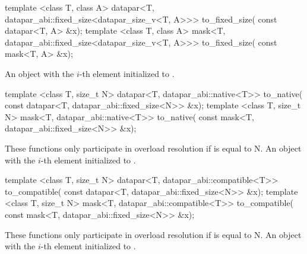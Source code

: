 \begin{itemdecl}
template <class T, class A>
datapar<T, datapar_abi::fixed_size<datapar_size_v<T, A>>> to_fixed_size(
    const datapar<T, A> &x);
template <class T, class A>
mask<T, datapar_abi::fixed_size<datapar_size_v<T, A>>> to_fixed_size(
    const mask<T, A> &x);
\end{itemdecl}
\begin{itemdescr}
  \pnum\returns An object with the $i$-th element initialized to .
\end{itemdescr}

\begin{itemdecl}
template <class T, size_t N>
datapar<T, datapar_abi::native<T>> to_native(
    const datapar<T, datapar_abi::fixed_size<N>> &x);
template <class T, size_t N>
mask<T, datapar_abi::native<T>> to_native(
    const mask<T, datapar_abi::fixed_size<N>> &x);
\end{itemdecl}
\begin{itemdescr}
  \pnum\remarks These functions only participate in overload resolution if  is equal to \code N.
  \pnum\returns An object with the $i$-th element initialized to .
\end{itemdescr}

\begin{itemdecl}
template <class T, size_t N>
datapar<T, datapar_abi::compatible<T>> to_compatible(
    const datapar<T, datapar_abi::fixed_size<N>> &x);
template <class T, size_t N>
mask<T, datapar_abi::compatible<T>> to_compatible(
    const mask<T, datapar_abi::fixed_size<N>> &x);
\end{itemdecl}
\begin{itemdescr}
  \pnum\remarks These functions only participate in overload resolution if  is equal to \code N.
  \pnum\returns An object with the $i$-th element initialized to .
\end{itemdescr}

